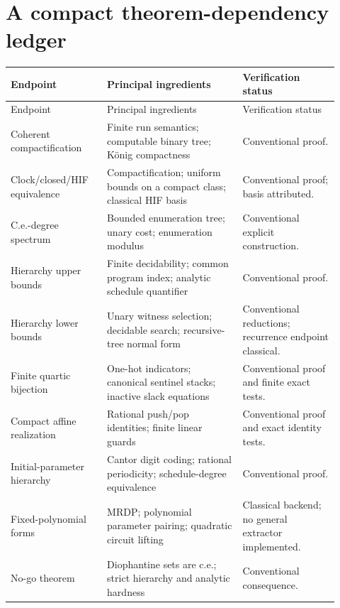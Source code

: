 \documentclass[11pt,letterpaper]{article}
\theoremstyle{definition}
\theoremstyle{remark}
\newcommand{\1}{\mathbf 1}
\begin{document}
\section{A compact theorem-dependency ledger}\label{lbh:app:dependencies}
\begin{longtable}{@{}p{0.27\linewidth}p{0.38\linewidth}p{0.27\linewidth}@{}}
\toprule
Endpoint & Principal ingredients & Verification status\\
\midrule
\endfirsthead
\toprule
Endpoint & Principal ingredients & Verification status\\
\midrule
\endhead
Coherent compactification & Finite run semantics; computable binary tree; K\"onig compactness & Conventional proof.\\
Clock/closed/HIF equivalence & Compactification; uniform bounds on a compact class; classical HIF basis & Conventional proof; basis attributed.\\
C.e.-degree spectrum & Bounded enumeration tree; unary cost; enumeration modulus & Conventional explicit construction.\\
Hierarchy upper bounds & Finite decidability; common program index; analytic schedule quantifier & Conventional proof.\\
Hierarchy lower bounds & Unary witness selection; decidable search; recursive-tree normal form & Conventional reductions; recurrence endpoint classical.\\
Finite quartic bijection & One-hot indicators; canonical sentinel stacks; inactive slack equations & Conventional proof and finite exact tests.\\
Compact affine realization & Rational push/pop identities; finite linear guards & Conventional proof and exact identity tests.\\
Initial-parameter hierarchy & Cantor digit coding; rational periodicity; schedule-degree equivalence & Conventional proof.\\
Fixed-polynomial forms & MRDP; polynomial parameter pairing; quadratic circuit lifting & Classical backend; no general extractor implemented.\\
No-go theorem & Diophantine sets are c.e.; strict hierarchy and analytic hardness & Conventional consequence.\\
\bottomrule
\end{longtable}
\clearpage
\end{document}

